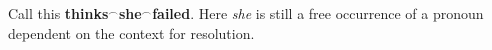 Call this \textbf{thinks$^\frown$she$^\frown$failed}. Here
\textit{she} is still a free occurrence of a pronoun dependent on the
context for resolution.  %
 
 
 
   

 
 
 
   

